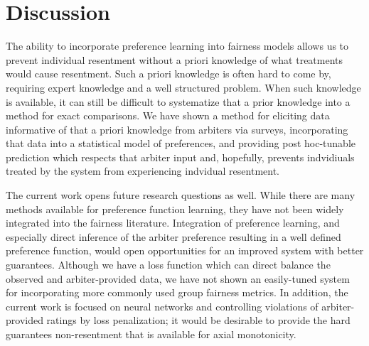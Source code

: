     \section{Discussion}\label{sec:sm_discussion}
    
        The ability to incorporate preference learning into fairness models allows us to prevent individual resentment without a priori knowledge of what treatments would cause resentment.  Such a priori knowledge is often hard to come by, requiring expert knowledge and a well structured problem.  When such knowledge is available, it can still be difficult to systematize that a prior knowledge into a method for exact comparisons.  We have shown a method for eliciting data informative of that a priori knowledge from arbiters via surveys, incorporating that data into a statistical model of preferences, and providing post hoc-tunable prediction which respects that arbiter input and, hopefully, prevents indvidiuals treated by the system from experiencing indvidual resentment. 
        
        The current work opens future research questions as well.  While there are many methods available for preference function learning, they  have not been widely integrated into the fairness literature.  Integration of preference learning, and especially direct inference of the arbiter preference resulting in a well defined preference function, would open opportunities for an improved system with better guarantees. Although we have a loss function which can direct balance the observed and arbiter-provided data, we have not shown an easily-tuned system for incorporating more commonly used group fairness metrics.  In addition, the current work is focused on neural networks and controlling violations of arbiter-provided ratings by loss penalization; it would be desirable to provide the hard guarantees non-resentment that is available for axial monotonicity.